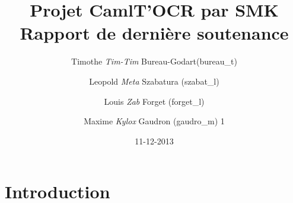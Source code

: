 \documentclass[12pt]{article}
\title{Projet CamlT'OCR par SMK \\ Rapport de dernière soutenance}
\date{11-12-2013}
\author{
  Timothe \textit{Tim-Tim} Bureau-Godart(bureau\_t) \and
  Leopold \textit{Meta} Szabatura (szabat\_l) \and
  Louis \textit{Zab} Forget (forget\_l) \and
  Maxime \textit{Kylox} Gaudron (gaudro\_m)
1      }
\begin{document}
\maketitle
\newpage
\tableofcontents
\newpage
\section{Introduction}






\end{document}
